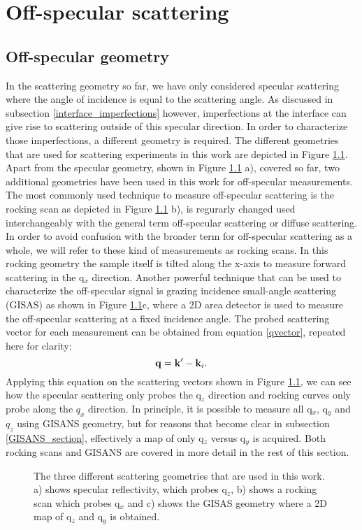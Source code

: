 \chapter{Off-specular scattering}\label{off_specular_section}
\section{Off-specular geometry}\label{offspec_geometry}
In the scattering geometry so far, we have only considered specular scattering where the angle of incidence is equal to the scattering angle. As discussed in subsection \ref{interface_imperfections} however, imperfections at the interface can give rise to scattering outside of this specular direction. In order to characterize those imperfections, a different geometry is required. The different geometries that are used for scattering experiments in this work are depicted in Figure \ref{scattering_geometries}. Apart from the specular geometry, shown in Figure \ref{scattering_geometries} a), covered so far, two additional geometries have been used in this work for off-specular measurements. The most commonly used technique to measure off-specular scattering is the rocking scan as depicted in Figure \ref{scattering_geometries} b), is regurarly changed used interchangeably with the general term off-specular scattering or diffuse scattering. In order to avoid confusion with the broader term for off-specular scattering as a whole, we will refer to these kind of measurements as rocking scans. In this rocking geometry the sample itself is tilted along the x-axis to measure forward scattering in the q$_x$ direction.  Another powerful technique that can be used to characterize the off-specular signal is grazing incidence small-angle scattering (GISAS) as shown in Figure \ref{scattering_geometries}c, where a 2D area detector is used to measure the off-specular scattering at a fixed incidence angle. The probed scattering vector for each measurement can be obtained from equation \ref{qvector}, repeated here for clarity:
\begin{equation}\label{qvector_repeat}
	\vb{q} =  \vb{k}^\prime - \vb{k}_i.
\end{equation}
Applying this equation on the scattering vectors shown in Figure \ref{scattering_geometries}, we can see how the specular scattering only probes the q$_z$ direction and rocking curves only probe along the $q_x$ direction. In principle, it is possible to measure all q$_x$, q$_y$ and $q_z$ using GISANS geometry, but for reasons that become clear in subsection \ref{GISANS_section}, effectively a map of only q$_z$ versus q$_y$ is acquired. Both rocking scans and GISANS are covered in more detail in the rest of this section.
\begin{figure}
	\vspace{-2mm}
	\centering
	\def\svgwidth{0.8\textwidth}
	
	\caption{The three different scattering geometries that are used in this work. a) shows specular reflectivity, which probes q$_z$, b) shows a rocking scan which probes q$_x$ and c) shows the GISAS geometry where a 2D map of q$_z$ and q$_y$ is obtained.}
	\label{scattering_geometries}
\end{figure}
\newpage
